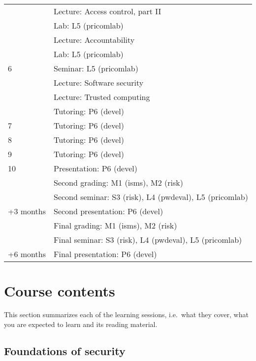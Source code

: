 \begin{table}
\begin{tabular}{lp{9cm}}
      & Lecture: Access control, part II\\
      & Lab: L5 (pricomlab)\\
      & Lecture: Accountability\\
      & Lab: L5 (pricomlab)\\
    \midrule
    6
      & Seminar: L5 (pricomlab)\\
      & Lecture: Software security\\
      & Lecture: Trusted computing\\
      & Tutoring: P6 (devel)\\
    \midrule
    7
      & Tutoring: P6 (devel)\\
    \midrule
    8
      & Tutoring: P6 (devel)\\
    \midrule
    9
      & Tutoring: P6 (devel)\\
    \midrule
    10
      & Presentation: P6 (devel)\\
      & Second grading: M1 (isms), M2 (risk)\\
      & Second seminar: S3 (risk), L4 (pwdeval), L5 (pricomlab)\\
    \midrule
    +3 months
      & Second presentation: P6 (devel)\\
      & Final grading: M1 (isms), M2 (risk)\\
      & Final seminar: S3 (risk), L4 (pwdeval), L5 (pricomlab)\\
    \midrule
    +6 months
      & Final presentation: P6 (devel)\\
    \bottomrule
  \end{tabular}
\end{table}


\section{Course contents}%
\label{CourseContents}

This section summarizes each of the learning sessions, i.e.\ what they cover, 
what you are expected to learn and its reading material.

%
%
\subsection{Foundations of security}


